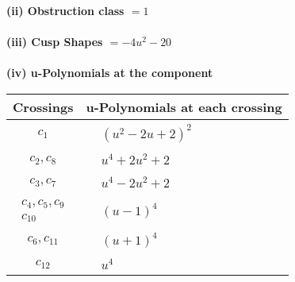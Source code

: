 \documentclass[1p]{elsarticle_modified}
\theoremstyle{definition}
\begin{document}
\flushleft \textbf{(ii) Obstruction class $= 1$}\\~\\
\flushleft \textbf{(iii) Cusp Shapes $= -4 u^2-20$}\\~\\
\newpage\renewcommand{\arraystretch}{1}
\flushleft \textbf{(iv) u-Polynomials at the component}\newline \\
\begin{tabular}{m{50pt}|m{274pt}}
Crossings & \hspace{64pt}u-Polynomials at each crossing \\
\hline $$\begin{aligned}c_{1}\end{aligned}$$&$\begin{aligned}
&(u^2-2 u+2)^2
\end{aligned}$\\
\hline $$\begin{aligned}c_{2},c_{8}\end{aligned}$$&$\begin{aligned}
&u^4+2 u^2+2
\end{aligned}$\\
\hline $$\begin{aligned}c_{3},c_{7}\end{aligned}$$&$\begin{aligned}
&u^4-2 u^2+2
\end{aligned}$\\
\hline $$\begin{aligned}c_{4},c_{5},c_{9}\\c_{10}\end{aligned}$$&$\begin{aligned}
&(u-1)^4
\end{aligned}$\\
\hline $$\begin{aligned}c_{6},c_{11}\end{aligned}$$&$\begin{aligned}
&(u+1)^4
\end{aligned}$\\
\hline $$\begin{aligned}c_{12}\end{aligned}$$&$\begin{aligned}
&u^4
\end{aligned}$\\
\hline
\end{tabular}\\~\\
\end{document}
